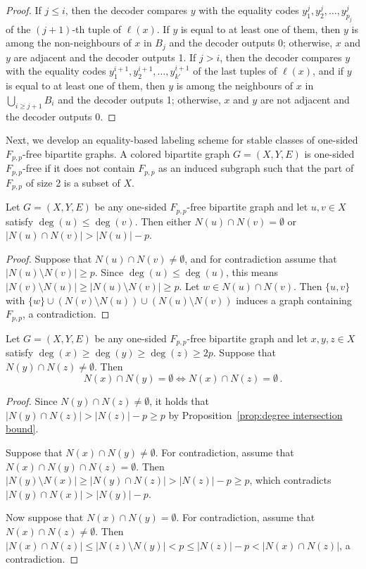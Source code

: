 \documentclass{theoretics}
\begin{document}
\begin{proof}
	If $j \leq i$, then the decoder compares $y$ with the equality codes $y^j_1, y^j_2, \ldots, y^j_{p_j}$ of the $(j+1)$-th tuple of $\ell(x)$. If $y$ is equal to at least one of them, then $y$ is among the non-neighbours of $x$ in $B_j$ and the decoder outputs 0; otherwise, $x$ and $y$ are adjacent and the decoder outputs 1.
	If $j > i$, then the decoder compares $y$ with the equality codes $y^{i+1}_1, y^{i+1}_2, \ldots, y^{i+1}_{k'}$ of the last tuples of $\ell(x)$, and
	if $y$ is equal to at least one of them, then $y$ is among the neighbours of $x$ in 
	$\bigcup_{i \geq j+1} B_i$ and the decoder outputs 1; otherwise, $x$ and $y$ are not adjacent and 
	the decoder outputs 0.
\end{proof}


\medskip
\noindent
Next, we develop an equality-based labeling scheme for stable classes of one-sided $F_{p,p}$-free bipartite graphs.
A colored bipartite graph $G = (X,Y,E)$ is one-sided $F_{p,p}$-free if it does not contain $F_{p,p}$
as an induced subgraph such that the part of $F_{p,p}$ of size 2 is a subset of $X$.

\begin{proposition}
\label{prop:degree intersection bound}
Let $G = (X,Y,E)$ be any one-sided $F_{p,p}$-free bipartite graph and let $u,v \in X$ satisfy $\deg(u) \leq \deg(v)$. Then either $N(u) \cap N(v) = \emptyset$ or $|N(u) \cap N(v)| > |N(u)|-p$.
\end{proposition}
\begin{proof}
Suppose that $N(u) \cap N(v) \neq \emptyset$, and for contradiction assume that $|N(u) \setminus
N(v)| \geq p$. Since $\deg(u) \leq \deg(u)$, this means $|N(v) \setminus N(u)| \geq |N(u)
\setminus N(v)| \geq p$. Let $w \in N(u) \cap N(v)$. Then $\{u,v\}$ with $\{w\} \cup (N(v) \setminus
N(u)) \cup (N(u) \setminus N(v))$ induces a graph containing $F_{p,p}$, a contradiction.
\end{proof}

\begin{proposition}
\label{prop:transitive intersections}
Let $G = (X,Y,E)$ be any one-sided $F_{p,p}$-free bipartite graph and let $x,y,z \in X$ satisfy $\deg(x) \geq \deg(y) \geq \deg(z) \geq 2p$. Suppose that $N(y) \cap N(z) \neq \emptyset$. Then
\[
  N(x) \cap N(y) = \emptyset \iff N(x) \cap N(z) = \emptyset \,.
\]
\end{proposition}
\begin{proof}
Since $N(y) \cap N(z) \neq \emptyset$, it holds that $|N(y) \cap N(z)| > |N(z)|-p \geq p$ by
Proposition~\ref{prop:degree intersection bound}.

Suppose that $N(x) \cap N(y) \neq \emptyset$. For contradiction, assume that $N(x) \cap N(y) \cap
N(z) = \emptyset$. Then $|N(y) \setminus N(x)| \geq |N(y) \cap N(z)| > |N(z)|-p \geq p$, which
contradicts $|N(y) \cap N(x)| > |N(y)|-p$.

Now suppose that $N(x) \cap N(y) = \emptyset$. For contradiction, assume that $N(x) \cap N(z) \neq
\emptyset$. Then $|N(x) \cap N(z)| \leq |N(z) \setminus N(y)| < p \leq |N(z)|-p
< |N(x) \cap N(z)|$, a contradiction.
\end{proof}
\end{document}
